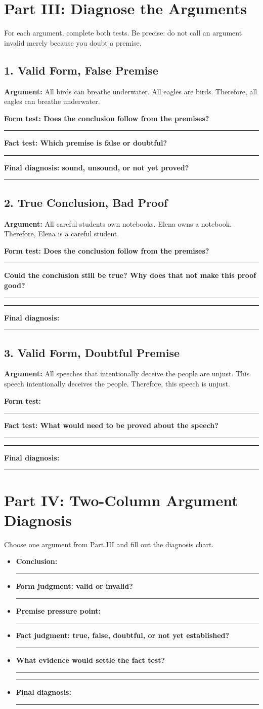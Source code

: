 \documentclass[12pt]{article}
\newcommand{\studentline}{\vspace{0.35em}\hrule\vspace{0.65em}}
\begin{document}
\section*{Part III: Diagnose the Arguments}
For each argument, complete both tests. Be precise: do not call an argument invalid merely because you doubt a premise.

\subsection*{1. Valid Form, False Premise}
\textbf{Argument:} All birds can breathe underwater. All eagles are birds. Therefore, all eagles can breathe underwater.

\textbf{Form test: Does the conclusion follow from the premises?}\studentline
\textbf{Fact test: Which premise is false or doubtful?}\studentline
\textbf{Final diagnosis: sound, unsound, or not yet proved?}\studentline

\subsection*{2. True Conclusion, Bad Proof}
\textbf{Argument:} All careful students own notebooks. Elena owns a notebook. Therefore, Elena is a careful student.

\textbf{Form test: Does the conclusion follow from the premises?}\studentline
\textbf{Could the conclusion still be true? Why does that not make this proof good?}\studentline\studentline
\textbf{Final diagnosis:}\studentline

\subsection*{3. Valid Form, Doubtful Premise}
\textbf{Argument:} All speeches that intentionally deceive the people are unjust. This speech intentionally deceives the people. Therefore, this speech is unjust.

\textbf{Form test:}\studentline
\textbf{Fact test: What would need to be proved about the speech?}\studentline\studentline
\textbf{Final diagnosis:}\studentline

\section*{Part IV: Two-Column Argument Diagnosis}
Choose one argument from Part III and fill out the diagnosis chart.

\begin{itemize}[leftmargin=*]
\item \textbf{Conclusion:}\studentline
\item \textbf{Form judgment: valid or invalid?}\studentline
\item \textbf{Premise pressure point:}\studentline
\item \textbf{Fact judgment: true, false, doubtful, or not yet established?}\studentline
\item \textbf{What evidence would settle the fact test?}\studentline\studentline
\item \textbf{Final diagnosis:}\studentline
\end{itemize}
\end{document}
